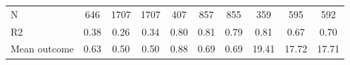 \begin{tabular}{lccc|ccc|ccc}
N           &         646         &        1707         &        1707         &         407         &         857         &         855         &         359         &         595         &         592         \\
R2          &        0.38         &        0.26         &        0.34         &        0.80         &        0.81         &        0.79         &        0.81         &        0.67         &        0.70         \\
Mean outcome&        0.63         &        0.50         &        0.50         &        0.88         &        0.69         &        0.69         &       19.41         &       17.72         &       17.71         \\
\bottomrule \end{tabular}
